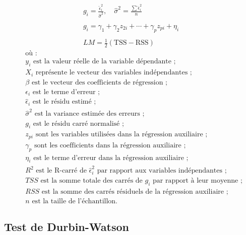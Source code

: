     \begin{equation}
    \label{annexes:equation:breusch-pagan}
    \begin{aligned}
g_i = \frac{\hat{\epsilon}_i^2}{\hat{\sigma}^2}, \quad \hat{\sigma}^2 = \frac{\sum \hat{\epsilon}_i^2}{n}\\\\
g_i = \gamma_1 + \gamma_2 z_{2i} + \cdots + \gamma_p z_{pi} + \eta_i\\\\
LM = \frac{1}{2} (\text{TSS} - \text{RSS})
    \end{aligned}
    \end{equation}
\begin{align*}
    &\text{où~:} \\
    &y_i \text{ est la valeur réelle de la variable dépendante~;} \\
    &X_i \text{ représente le vecteur des variables indépendantes~;} \\
    &\beta \text{ est le vecteur des coefficients de régression~;} \\
    &\epsilon_i \text{ est le terme d'erreur~;} \\
    &\hat{\epsilon}_i \text{ est le résidu estimé~;} \\
    &\hat{\sigma}^2 \text{ est la variance estimée des erreurs~;} \\
    &g_i \text{ est le résidu carré normalisé~;} \\
    &z_{pi} \text{ sont les variables utilisées dans la régression auxiliaire~;} \\
    &\gamma_p \text{ sont les coefficients dans la régression auxiliaire~;} \\
    &\eta_i \text{ est le terme d'erreur dans la régression auxiliaire~;} \\
    &R^2 \text{ est le R-carré de } \hat{\epsilon}_i^2 \text{ par rapport aux variables indépendantes~;} \\
    &TSS \text{ est la somme totale des carrés de } g_i \text{ par rapport à leur moyenne~;} \\
    &RSS \text{ est la somme des carrés résiduels de la régression auxiliaire~;} \\
    &n \text{ est la taille de l'échantillon.}
\end{align*}

\subsection{Test de Durbin-Watson}
    \label{annexes:methodologie-ols-durbin-watson}

